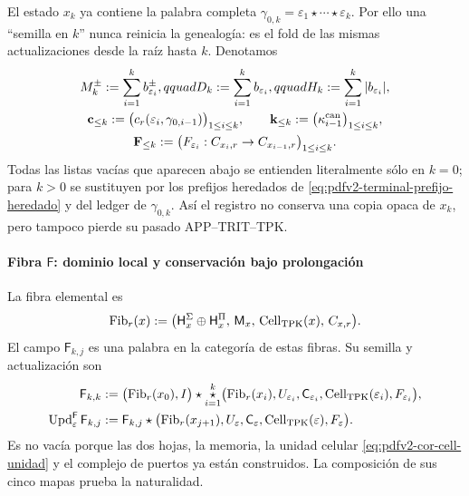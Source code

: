 El estado \(x_k\) ya contiene la palabra completa
\(\gamma_{0,k}=\varepsilon_1\star\cdots\star\varepsilon_k\). Por ello una
``semilla en \(k\)'' nunca reinicia la genealogía: es el fold de las mismas
actualizaciones desde la raíz hasta \(k\). Denotamos
\begin{equation}
\label{eq:pdfv2-terminal-prefijo-heredado}
 \begin{gathered}
 M_k^\pm:=\sum_{i=1}^{k}b_{\varepsilon_i}^\pm,qquad
 D_k:=\sum_{i=1}^{k}b_{\varepsilon_i},qquad
 H_k:=\sum_{i=1}^{k}|b_{\varepsilon_i}|,\\
 \mathbf c_{\leq k}:=
  \bigl(c_r(\varepsilon_i,\gamma_{0,i-1})\bigr)_{1\leq i\leq k},
 \qquad
 \mathbf k_{\leq k}:=
  \bigl(\kappa_{i-1}^{\rm can}\bigr)_{1\leq i\leq k},\\
 \mathbf F_{\leq k}:=
  \bigl(F_{\varepsilon_i}:C_{x_i,r}\to C_{x_{i-1},r}\bigr)_{1\leq i\leq k}.
 \end{gathered}
\end{equation}
Todas las listas vacías que aparecen abajo se entienden literalmente sólo
en \(k=0\); para \(k>0\) se sustituyen por los prefijos heredados de
\eqref{eq:pdfv2-terminal-prefijo-heredado} y del ledger de
\(\gamma_{0,k}\). Así el registro no conserva una copia opaca de \(x_k\),
pero tampoco pierde su pasado APP--TRIT--TPK.

\paragraph{Fibra \(\mathsf F\): dominio local y conservación bajo prolongación}
La fibra elemental es
\begin{equation}
\label{eq:pdfv2-terminal-tipo-fibra}
 \operatorname{Fib}_r(x):=
 \bigl(\mathsf H_x^\Sigma\oplus\mathsf H_x^\Pi,\,
       \mathsf M_x,\,
       \operatorname{Cell}_{\rm TPK}(x),\,C_{x,r}\bigr).
\end{equation}
El campo \(\mathsf F_{k,j}\) es una palabra en la categoría de estas fibras.
Su semilla y actualización son
\begin{align}
 \mathsf F_{k,k}
 &:=\bigl(\operatorname{Fib}_r(x_0),I\bigr)\star
 \mathop{\star}_{i=1}^{k}
 \bigl(\operatorname{Fib}_r(x_i),U_{\varepsilon_i},
 \mathsf C_{\varepsilon_i},\operatorname{Cell}_{\rm TPK}(\varepsilon_i),
 F_{\varepsilon_i}\bigr),
 \label{eq:pdfv2-terminal-semilla-f}\\
 \operatorname{Upd}^{\mathsf F}_{\varepsilon}\mathsf F_{k,j}
 &:=
 \mathsf F_{k,j}\star
 \bigl(\operatorname{Fib}_r(x_{j+1}),U_\varepsilon,
 \mathsf C_\varepsilon,\operatorname{Cell}_{\rm TPK}(\varepsilon),
 F_\varepsilon\bigr).
 \label{eq:pdfv2-terminal-update-f}
\end{align}
Es no vacía porque las dos hojas, la memoria, la unidad celular
\eqref{eq:pdfv2-cor-cell-unidad} y el complejo de puertos ya están
construidos. La composición de sus cinco mapas prueba la naturalidad.

